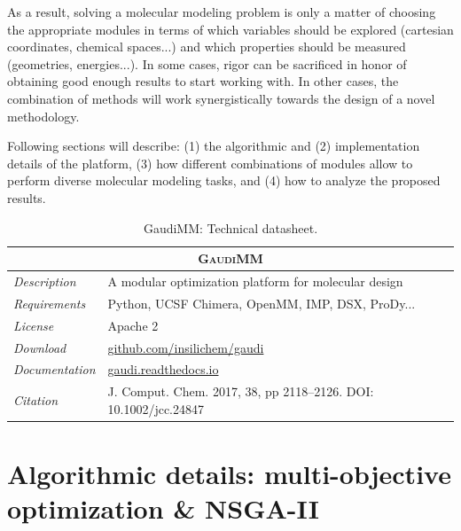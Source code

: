 As a result, solving a molecular modeling problem is only a matter of choosing the appropriate modules in terms of which variables should be explored (cartesian coordinates, chemical spaces...) and which properties should be measured (geometries, energies...). In some cases, rigor can be sacrificed in honor of obtaining good enough results to start working with. In other cases, the combination of methods will work synergistically towards the design of a novel methodology.

Following sections will describe: (1) the algorithmic and (2) implementation details of the platform, (3) how different combinations of modules allow to perform diverse molecular modeling tasks, and (4) how to analyze the proposed results.



\begin{table}[hbtp]
	\caption[GaudiMM: Technical datasheet]{GaudiMM: Technical datasheet.}
	\footnotesize
	\newcommand{\tableheading}[1]{\multicolumn{2}{c}{\textsc{#1}}}
	\begin{tabularx}{\textwidth}{RL}
		\toprule
		\tableheading{GaudiMM} \\
		\toprule
		\textit{Description} & A modular optimization platform for molecular design \\
		\midrule
		\textit{Requirements} & Python, UCSF Chimera, OpenMM, IMP, DSX, ProDy... \\
		\midrule
		\textit{License} & Apache 2 \\
		\midrule
		\textit{Download} & \href{https://github.com/insilichem/gaudi}{github.com/insilichem/gaudi} \\
		\midrule
		\textit{Documentation} & \href{https://gaudi.readthedocs.io}{gaudi.readthedocs.io} \\
		\midrule
		\textit{Citation} & J. Comput. Chem. 2017, 38, pp 2118–2126. DOI: 10.1002/jcc.24847 \\
		\bottomrule

	\end{tabularx}
\end{table}



\section[Algorithmic details]{Algorithmic details: multi-objective optimization \& NSGA-II}

